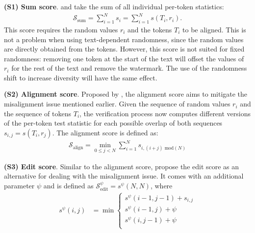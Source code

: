 \smallskip\noindent\textbf{(S1) Sum score}.
%
\citet{aaronson_watermarking_2022} and \citet{kirchenbauer_watermark_2023} take the sum of all individual per-token statistics:
\begin{align}
    \mathcal{S}_{\text{sum}}=\sum_{i=1}^N s_i = \sum_{i=1}^N s(T_i, r_i).
\end{align}
%
This score requires the random values $r_i$ and the tokens $T_i$ to be aligned.
%
This is not a problem when using text-dependent randomness, since the random values are directly obtained from the tokens.
%
However, this score is not suited for fixed randomness: removing one token at the start of the text will offset the values of $r_i$ for the rest of the text and remove the watermark.
%
The use of the randomness shift to increase diversity will have the same effect. 

\smallskip\noindent\textbf{(S2) Alignment score}.
Proposed by \citet{kuditipudi_robust_2023}, the alignment score aims to mitigate the misalignment issue mentioned earlier.
%
Given the sequence of random values $r_i$ and the sequence of tokens $T_i$, the verification process now computes different versions of the per-token test statistic for each possible overlap of both sequences $s_{i,j} = s(T_i, r_j)$.
%
The alignment score is defined as:
\begin{align}
   \mathcal{S}_{\text{align}}  = \min\limits_{0 \leq j < N} \sum\limits_{i=1}^N s_{i, (i+j) \text{ mod}(N)}
\end{align}

\smallskip\noindent\textbf{(S3) Edit score}.
Similar to the alignment score, \citet{kuditipudi_robust_2023} propose the edit score as an alternative for dealing with the misalignment issue.
%
It comes with an additional parameter $\psi$ and is defined as $\mathcal{S}_{\text{edit}}^\psi = s^\psi(N,N)$, where
\begin{align}
    s^\psi (i,j) &= \min \begin{cases}
      s^\psi (i-1, j-1) + s_{i,j}\\
      s^\psi (i-1, j) + \psi\\
      s^\psi (i, j-1) + \psi\\
    \end{cases} 
\end{align}

